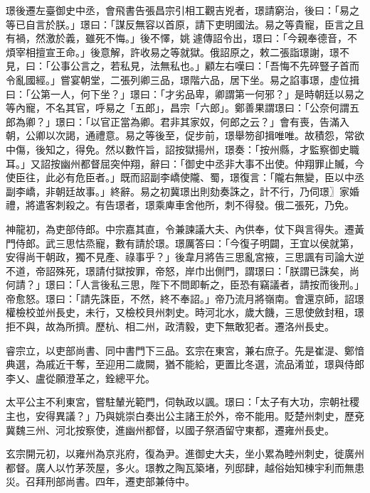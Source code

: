 \begin{pinyinscope}
 璟後遷左臺御史中丞，會飛書告張昌宗引相工觀吉兇者，璟請窮治，後曰：「易之等已自言於朕。」璟曰：「謀反無容以首原，請下吏明國法。易之等貴寵，臣言之且有禍，然激於義，雖死不悔。」後不懌，姚遽傳詔令出，璟曰：「今親奉德音，不煩宰相擅宣王命。」後意解，許收易之等就獄。俄詔原之，敕二張詣璟謝，璟不見，曰：「公事公言之，若私見，法無私也。」顧左右嘆曰：「吾悔不先碎豎子首而令亂國經。」嘗宴朝堂，二張列卿三品，璟階六品，居下坐。易之諂事璟，虛位揖曰：「公第一人，何下坐？」璟曰：「才劣品卑，卿謂第一何邪？」是時朝廷以易之等內寵，不名其官，呼易之「五郎」，昌宗「六郎」。鄭善果謂璟曰：「公奈何謂五郎為卿？」璟曰：「以官正當為卿。君非其家奴，何郎之云？」會有喪，告滿入朝，公卿以次謁，通禮意。易之等後至，促步前，璟舉笏卻揖唯唯。故積怨，常欲中傷，後知之，得免。然以數忤旨，詔按獄揚州，璟奏：「按州縣，才監察御史職耳。」又詔按幽州都督屈突仲翔，辭曰：「御史中丞非大事不出使。仲翔罪止贓，今使臣往，此必有危臣者。」既而詔副李嶠使隴、蜀，璟復言：「隴右無變，臣以中丞副李嶠，非朝廷故事。」終辭。易之初冀璟出則劾奏誅之，計不行，乃伺璟〗家婚禮，將遣客刺殺之。有告璟者，璟乘庳車舍他所，刺不得發。俄二張死，乃免。



 神龍初，為吏部侍郎。中宗嘉其直，令兼諫議大夫、內供奉，仗下與言得失。遷黃門侍郎。武三思怙烝寵，數有請於璟。璟厲答曰：「今復子明闢，王宜以侯就第，安得尚干朝政，獨不見產、祿事乎？」後韋月將告三思亂宮掖，三思諷有司論大逆不道，帝詔殊死，璟請付獄按罪，帝怒，岸巾出側門，謂璟曰：「朕謂已誅矣，尚何請？」璟曰：「人言後私三思，陛下不問即斬之，臣恐有竊議者，請按而後刑。」帝愈怒。璟曰：「請先誅臣，不然，終不奉詔。」帝乃流月將嶺南。會還京師，詔璟權檢校並州長史，未行，又檢校貝州刺史。時河北水，歲大饑，三思使斂封租，璟拒不與，故為所擠。歷杭、相二州，政清毅，吏下無敢犯者。遷洛州長史。



 睿宗立，以吏部尚書、同中書門下三品。玄宗在東宮，兼右庶子。先是崔湜、鄭愔典選，為戚近干奪，至迎用二歲闕，猶不能給，更置比冬選，流品淆並，璟與侍郎李乂、盧從願澄革之，銓總平允。



 太平公主不利東宮，嘗駐輦光範門，伺執政以諷。璟曰：「太子有大功，宗朝社稷主也，安得異議？」乃與姚崇白奏出公主諸王於外，帝不能用。貶楚州刺史，歷兗冀魏三州、河北按察使，進幽州都督，以國子祭酒留守東都，遷雍州長史。



 玄宗開元初，以雍州為京兆府，復為尹。進御史大夫，坐小累為睦州刺史，徙廣州都督。廣人以竹茅茨屋，多火。璟教之陶瓦築堵，列邸肆，越俗始知棟宇利而無患災。召拜刑部尚書。四年，遷吏部兼侍中。




\end{pinyinscope}
